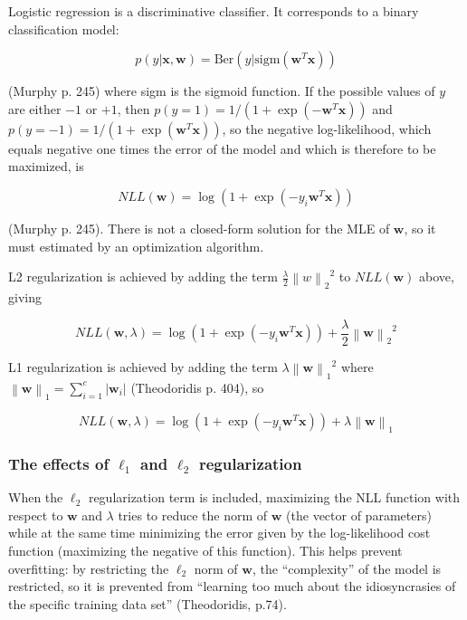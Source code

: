 \documentclass[letterpaper, 12pt]{article}
\newcommand{\norm}[1]{\left\lVert #1 \right\rVert}
\newcommand{\vect}[1]{\boldsymbol{#1}}
\begin{document}
Logistic regression is a discriminative classifier. It corresponds to a binary classification model:

\begin{equation*}
  p(y | \vect{x}, \vect{w}) = \text{Ber}(y | \text{sigm}(\vect{w}^T\vect{x}))
\end{equation*}

(Murphy p. 245) where sigm is the sigmoid function. If the possible values of $y$ are either $-1$ or $+1$, then $p(y = 1) = 1 / (1 + \exp(-\vect{w}^T\vect{x}))$ and $p(y = -1) = 1 / (1 + \exp(\vect{w}^T\vect{x}))$, so the negative log-likelihood, which equals negative one times the error of the model and which is therefore to be maximized, is

\begin{equation*}
  NLL(\vect{w}) = \log(1 + \exp(-y_i \vect{w}^T\vect{x}))
\end{equation*}

(Murphy p. 245). There is not a closed-form solution for the MLE of $\vect{w}$, so it must estimated by an optimization algorithm.

L2 regularization is achieved by adding the term $\frac{\lambda}{2} {\norm{w}_2}^2$ to $NLL(\vect{w})$ above, giving

\begin{equation*}
  NLL(\vect{w}, \lambda) = \log(1 + \exp(-y_i \vect{w}^T\vect{x})) + \frac{\lambda}{2} {\norm{\vect{w}}_2}^2
\end{equation*}

L1 regularization is achieved by adding the term $\lambda {\norm{\vect{w}}_1}^2$ where $\norm{\vect{w}}_1 = \sum_{i=1}^{c} |\vect{w}_i|$ (Theodoridis p. 404), so

\begin{equation*}
  NLL(\vect{w}, \lambda) = \log(1 + \exp(-y_i \vect{w}^T\vect{x})) + \lambda {\norm{\vect{w}}_1}
\end{equation*}

\subsubsection{The effects of $\ell_1$ and $\ell_2$ regularization}

When the $\ell_2$ regularization term is included, maximizing the NLL function with respect to $\vect{w}$ and $\lambda$ tries to reduce the norm of $\vect{w}$ (the vector of parameters) while at the same time minimizing the error given by the log-likelihood cost function (maximizing the negative of this function). This helps prevent overfitting: by restricting the $\ell_2$ norm of $\vect{w}$, the ``complexity'' of the model is restricted, so it is prevented from ``learning too much about the idiosyncrasies of the specific training data set'' (Theodoridis, p.74).
\end{document}

